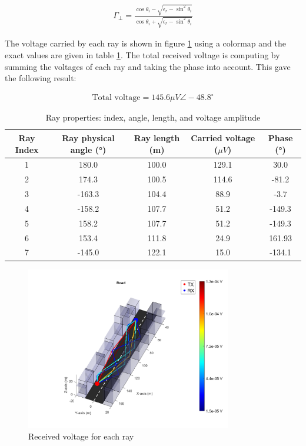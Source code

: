 \documentclass[10pt,a4paper]{ULBreport}
\begin{document}
\begin{align*}
    \Gamma_{\perp} = \frac{\cos \theta_i - \sqrt{\epsilon_r-\sin^2\theta_i}}{\cos \theta_i + \sqrt{\epsilon_r-\sin^2\theta_i}}
\end{align*}

The voltage carried by each ray is shown in figure \ref{fig:voltageDemo} using a colormap and the exact values are given in table \ref{tab:ray_properties}. The total received voltage is computing by summing the voltages of each ray and taking the phase into account. This gave the following result:

\begin{align*}
    \text{Total voltage} = 145.6 \mu V \angle -48.8^\circ
\end{align*}

\begin{table}[H]
    \centering
    \begin{tabular}{|c|c|c|c|c|}
        \hline
        Ray Index & Ray physical angle (°) & Ray length (m) & Carried voltage ($\mu V$) & Phase (°) \\ \hline
        1 & 180.0 & 100.0 & 129.1 & 30.0\\ \hline
        2 & 174.3 & 100.5 & 114.6 & -81.2\\ \hline
        3 & -163.3 & 104.4 & 88.9 & -3.7\\ \hline
        4 & -158.2 & 107.7 & 51.2 & -149.3\\ \hline
        5 & 158.2 & 107.7 & 51.2 & -149.3\\ \hline
        6 & 153.4 & 111.8 & 24.9 & 161.93\\ \hline
        7 & -145.0 & 122.1 & 15.0 & -134.1\\ \hline
    \end{tabular}
    \caption{Ray properties: index, angle, length, and voltage amplitude}
    \label{tab:ray_properties}
\end{table}

\begin{figure}[H]
    \centering
    \includegraphics[width=0.8\textwidth]{3_2.png}
    \caption{Received voltage for each ray}
    \label{fig:voltageDemo}
\end{figure}
\end{document}
